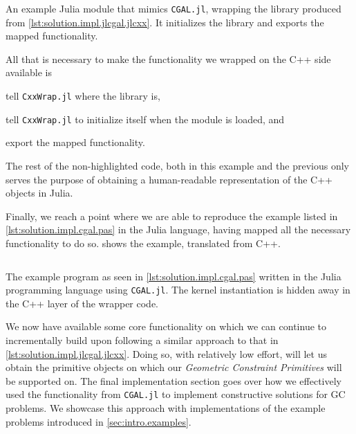 \begin{listing}[htbp]
  \inputminted[highlightlines={4-6,8,10}]{julia}{jl/CGAL.jl} 
  \caption[Bare-bones Julia module wrapping some of CGAL]{
    An example Julia module that mimics \texttt{CGAL.jl}, wrapping the library
    produced from \cref{lst:solution.impl.jlcgal.jlcxx}.  It initializes the
    library and exports the mapped functionality.}%
  \label{lst:solution.impl.jlcgal.cgal}
\end{listing}

All that is necessary to make the functionality we wrapped on the C++ side
available is
\begin{enumerate*}[label= (\arabic*)]
  \item tell \texttt{CxxWrap.jl} where the library is,
  \item tell \texttt{CxxWrap.jl} to initialize itself when the module is loaded,
  and
  \item export the mapped functionality.
\end{enumerate*}
The rest of the non-highlighted code, both in this example and the previous
only serves the purpose of obtaining a human-readable representation of the C++
objects in Julia.

Finally, we reach a point where we are able to reproduce the example listed in
\cref{lst:solution.impl.cgal.pas} in the Julia language, having mapped all the
necessary functionality to do so.   shows the
example, translated from C++.

\begin{listing}[htbp]
  \inputminted{julia}{jl/points_and_segments.jl}
  \caption[CGAL.jl: Three points and one segment]{
    The example program as seen in \cref{lst:solution.impl.cgal.pas} written in
    the Julia programming language using \texttt{CGAL.jl}.  The kernel
    instantiation is hidden away in the C++ layer of the wrapper code.}%
  \label{lst:solution.impl.jlcgal.pas}
\end{listing}

We now have available some core functionality on which we can continue to
incrementally build upon following a similar approach to that in
\cref{lst:solution.impl.jlcgal.jlcxx}.  Doing so, with relatively low effort,
will let us obtain the primitive objects on which our \textit{Geometric
Constraint Primitives} will be supported on.  The final implementation section
goes over how we effectively used the functionality from \texttt{CGAL.jl} to
implement constructive solutions for \ac{GC} problems.  We showcase this
approach with implementations of the example problems introduced in
\cref{sec:intro.examples}.
